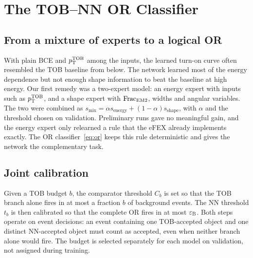\section{The TOB--NN OR Classifier}
\label{app:or}

\subsection{From a mixture of experts to a logical OR}
With plain BCE and $p_{\mathrm{T}}^{\mathrm{TOB}}$ among the inputs, the learned turn-on curve often resembled the TOB baseline from below. The network learned most of the energy dependence but not enough shape information to beat the baseline at high energy. Our first remedy was a two-expert model: an energy expert with inputs such as $p_{\mathrm{T}}^{\mathrm{TOB}}$, and a shape expert with $\mathrm{Frac}_{\mathrm{EM2}}$, widths and angular variables. The two were combined as $s_{\mathrm{mix}}=\alpha s_{\mathrm{energy}}+(1-\alpha)s_{\mathrm{shape}}$, with $\alpha$ and the threshold chosen on validation. Preliminary runs gave no meaningful gain, and the energy expert only relearned a rule that the eFEX already implements exactly. The OR classifier~\eqref{eq:or} keeps this rule deterministic and gives the network the complementary task.

\subsection{Joint calibration}
Given a TOB budget $b$, the comparator threshold $C_b$ is set so that the TOB branch alone fires in at most a fraction $b$ of background events. The NN threshold $t_b$ is then calibrated so that the complete OR fires in at most $\varepsilon_{\mathrm{B}}$. Both steps operate on event decisions: an event containing one TOB-accepted object and one distinct NN-accepted object must count as accepted, even when neither branch alone would fire. The budget is selected separately for each model on validation, not assigned during training.

